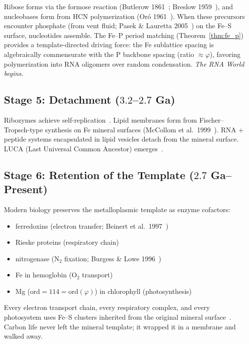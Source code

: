 \documentclass[12pt]{article}
\theoremstyle{principia}
\theoremstyle{definition}
\theoremstyle{remark}
\providecommand{\vp}{\varphi}
\begin{document}
Ribose forms via the formose reaction (Butlerow 1861~\cite{Butlerow1861}; Breslow 1959~\cite{Breslow59}), and nucleobases form from HCN polymerization (Or\'o 1961~\cite{Oro61}). When these precursors encounter phosphate (from vent fluid; Pasek \& Lauretta 2005~\cite{Pasek05}) on the Fe--S surface, nucleotides assemble. The Fe--P period matching (Theorem~\ref{thm:fe_p}) provides a template-directed driving force: the Fe sublattice spacing is algebraically commensurate with the P backbone spacing (ratio $\approx \vp$), favoring polymerization into RNA oligomers over random condensation. \emph{The RNA World begins.}

\subsection{Stage 5: Detachment ($3.2$--$2.7$ Ga)}

Ribozymes achieve self-replication~\cite{Bartel93, Johnston01}. Lipid membranes form from Fischer--Tropsch-type synthesis on Fe mineral surfaces (McCollom et al.\ 1999~\cite{McCollom99}). RNA + peptide systems encapsulated in lipid vesicles detach from the mineral surface. LUCA (Last Universal Common Ancestor) emerges~\cite{Weiss16}.

\subsection{Stage 6: Retention of the Template ($2.7$ Ga--Present)}

Modern biology preserves the metalloplasmic template as enzyme cofactors:
\begin{itemize}[noitemsep]
    \item [4Fe--4S] ferredoxins (electron transfer; Beinert et al.\ 1997~\cite{Beinert97})
    \item [2Fe--2S] Rieske proteins (respiratory chain)
    \item [Fe--Mo--S] nitrogenase (N$_2$ fixation; Burgess \& Lowe 1996~\cite{Burgess96})
    \item Fe in hemoglobin (O$_2$ transport)
    \item Mg ($\mathrm{ord} = 114 = \mathrm{ord}(\vp)$) in chlorophyll (photosynthesis)
\end{itemize}

\noindent Every electron transport chain, every respiratory complex, and every photosystem uses Fe--S clusters inherited from the original mineral surface~\cite{Eck66, Hall71}. Carbon life never left the mineral template; it wrapped it in a membrane and walked away.
\end{document}
